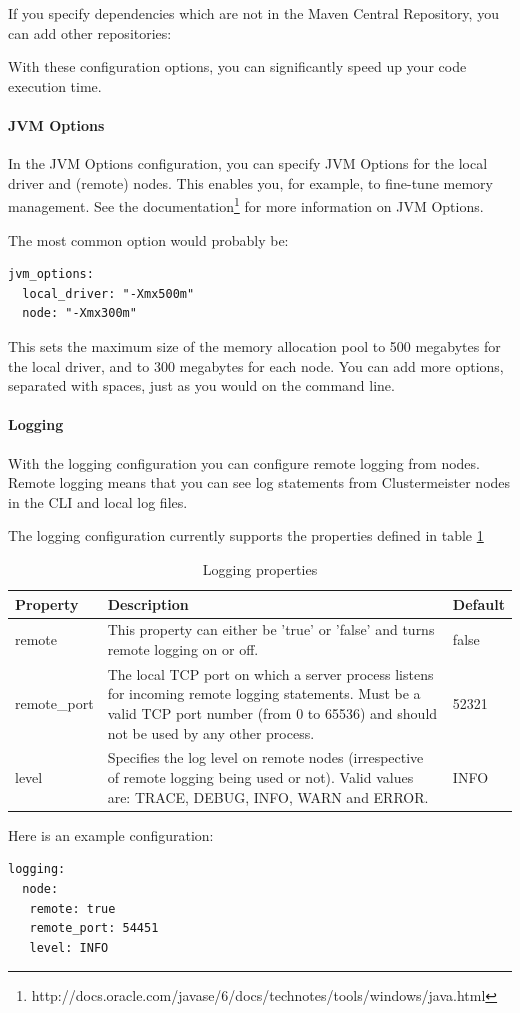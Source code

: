 \documentclass{article}
\begin{document}
If you specify dependencies which are not in the Maven Central Repository, you can add other repositories:



With these configuration options, you can significantly speed up your code execution time.

\paragraph{JVM Options}

In the JVM Options configuration, you can specify JVM Options for the local driver and (remote) nodes. This enables you, for example, to fine-tune memory management. See the documentation\footnote{http://docs.oracle.com/javase/6/docs/technotes/tools/windows/java.html} for more information on JVM Options.

The most common option would probably be:

\begin{lstlisting}[breaklines=true, frame=single]
jvm_options:
  local_driver: "-Xmx500m"
  node: "-Xmx300m"
\end{lstlisting}

This sets the maximum size of the memory allocation pool to 500 megabytes for the local driver, and to 300 megabytes for each node. You can add more options, separated with spaces, just as you would on the command line.

\paragraph{Logging}

With the logging configuration you can configure remote logging from nodes. Remote logging means that you can see log statements from Clustermeister nodes in the CLI and local log files.

The logging configuration currently supports the properties defined in table \ref{tab:loggingproperties}

\begin{table}[h]
\centering
\begin{tabular}{| l | p{9cm} | l |}
\hline
\textbf{Property} & \textbf{Description} & \textbf{Default} \\ \hline
remote & This property can either be 'true' or 'false' and turns remote logging on or off. & false \\ \hline
remote\_port & The local TCP port on which a server process listens for incoming remote logging statements. Must be a valid TCP port number (from 0 to 65536) and should not be used by any other process. & 52321 \\ \hline
level & Specifies the log level on remote nodes (irrespective of remote logging being used or not). Valid values are: TRACE, DEBUG, INFO, WARN and ERROR. & INFO \\ \hline
\end{tabular}
\caption{Logging properties}
\label{tab:loggingproperties}
\end{table}

Here is an example configuration:

\begin{lstlisting}[breaklines=true, frame=single]
logging:
  node:
   remote: true
   remote_port: 54451
   level: INFO
\end{lstlisting}
\end{document}
